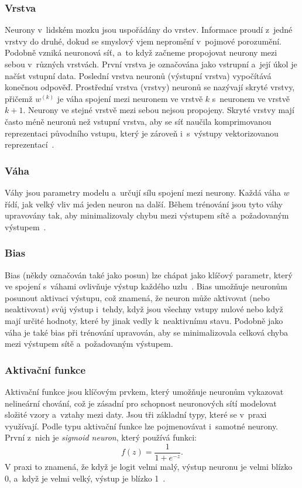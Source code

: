 \subsubsection*{Vrstva}
Neurony v~lidském mozku jsou uspořádány do vrstev. Informace proudí z~jedné vrstvy do druhé, dokud se smyslový vjem nepromění v~pojmové porozumění. Podobně vzniká neuronová síť, a~to když začneme propojovat neurony mezi sebou v~různých vrstvách. První vrstva je označována jako vstrupní a~její úkol je načíst vstupní data. Poslední vrstva neuronů (výstupní vrstva) vypočítává konečnou odpověď. Prostřední vrstva (vrstvy) neuronů se nazývají skryté vrstvy, přičemž $w^{(k)}$ je váha spojení mezi neuronem ve vrstvě $k$ s~neuronem ve vrstvě $k+1$. Neurony ve stejné vrstvě mezi sebou nejsou propojeny. Skryté vrstvy mají často méně neuronů než vstupní vrstva, aby se síť naučila komprimovanou reprezentaci původního vstupu, který je zároveň i~s~výstupy vektorizovanou reprezentací~\cite{dl_fundamentals}.

\subsubsection*{Váha}
Váhy jsou parametry modelu a~určují sílu spojení mezi neurony. Každá váha $w$ řídí, jak velký vliv má jeden neuron na další. Během trénování jsou tyto váhy upravovány tak, aby minimalizovaly chybu mezi výstupem sítě a~požadovaným výstupem~\cite{Goodfellow-et-al-2016}. 

\subsubsection*{Bias}
Bias (někdy označován také jako posun) lze chápat jako klíčový parametr, který ve spojení s~váhami ovlivňuje výstup každého uzlu~\cite{NN_DL}. Bias umožňuje neuronům posunout aktivaci výstupu, což znamená, že neuron může aktivovat (nebo neaktivovat) svůj výstup i~tehdy, když jsou všechny vstupy nulové nebo když mají určité hodnoty, které by jinak vedly k~neaktivnímu stavu. Podobně jako váha je také bias při trénování upravován, aby se minimalizovala celková chyba mezi výstupem sítě a~požadovaným výstupem.

\subsubsection*{Aktivační funkce}
Aktivační funkce jsou klíčovým prvkem, který umožňuje neuronům vykazovat nelineární chování, což je zásadní pro schopnost neuronových sítí modelovat složité vzory a~vztahy mezi daty. Jsou tři základní typy, které se v~praxi využívají. Podle typu aktivační funkce lze pojmenovávat i~samotné neurony. První z~nich je \textit{sigmoid neuron}, který používá funkci: 
$$f(z) = \frac{1}{1+e^{-z}}.$$
V praxi to znamená, že když je logit velmi malý, výstup neuronu je velmi blízko 0, a~když je velmi velký, výstup je blízko 1~\cite{dl_fundamentals}.

